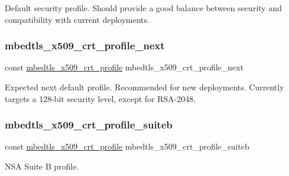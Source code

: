 Default security profile. Should provide a good balance between security and compatibility with current deployments. \mbox{\label{group__x509__module_ga8ab1f8a044fd25f76ecb4ba15c6d5bcd}} 
\subsubsection{\texorpdfstring{mbedtls\+\_\+x509\+\_\+crt\+\_\+profile\+\_\+next}{mbedtls\_x509\_crt\_profile\_next}}
{\footnotesize\ttfamily const \mbox{\hyperlink{structmbedtls__x509__crt__profile}{mbedtls\+\_\+x509\+\_\+crt\+\_\+profile}} mbedtls\+\_\+x509\+\_\+crt\+\_\+profile\+\_\+next}

Expected next default profile. Recommended for new deployments. Currently targets a 128-\/bit security level, except for R\+S\+A-\/2048. \mbox{\label{group__x509__module_gaf09067a39129236125e353a68ceb45d6}} 
\subsubsection{\texorpdfstring{mbedtls\+\_\+x509\+\_\+crt\+\_\+profile\+\_\+suiteb}{mbedtls\_x509\_crt\_profile\_suiteb}}
{\footnotesize\ttfamily const \mbox{\hyperlink{structmbedtls__x509__crt__profile}{mbedtls\+\_\+x509\+\_\+crt\+\_\+profile}} mbedtls\+\_\+x509\+\_\+crt\+\_\+profile\+\_\+suiteb}

N\+SA Suite B profile. 